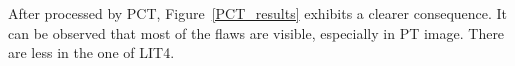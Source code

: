 \documentclass[]{spie}  %
\begin{document}
After processed by PCT, Figure~\ref{PCT_results} exhibits a clearer consequence. It can be observed that most of the flaws are visible, especially in PT image. There are less in the one of LIT4.
\begin{figure}[ht]
    \centering
    \hspace{10pt}
    \hspace{10pt}
\end{figure}
\end{document}
